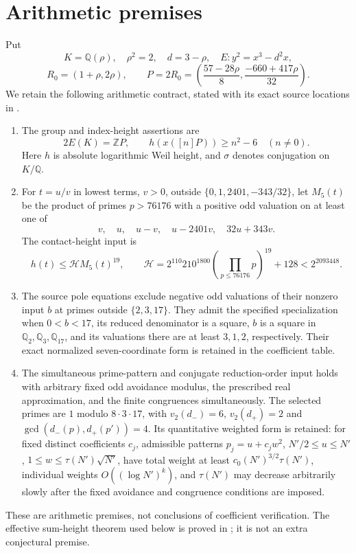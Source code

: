 \documentclass[11pt,a4paper]{article}
\theoremstyle{remark}\newtheorem{remark}[theorem]{Remark}
\newcommand{\Q}{\mathbb Q}\newcommand{\Z}{\mathbb Z}\newcommand{\HH}{\mathcal H}
\begin{document}
\section{Arithmetic premises}\label{sec:premises}
Put
\[
 K=\Q(\rho),\quad\rho^2=2,\quad d=3-\rho,\quad
 E:y^2=x^3-d^2x,
\]
\[
 R_0=(1+\rho,2\rho),\qquad
 P=2R_0=\left(\frac{57-28\rho}{8},\frac{-660+417\rho}{32}\right).
\]
We retain the following arithmetic contract, stated with its exact
source locations in \cite[Section~2]{Source}.
\begin{enumerate}
\item The group and index-height assertions are
\[
 2E(K)=\Z P,\qquad h(x([n]P))\ge n^2-6\quad(n\ne0).
\]
Here $h$ is absolute logarithmic Weil height, and $\sigma$ denotes
conjugation on $K/\Q$.
\item For $t=u/v$ in lowest terms, $v>0$, outside
$\{0,1,2401,-343/32\}$, let $M_5(t)$ be the product of primes
$p>76176$ with a positive odd valuation on at least one of
\[
             v,\quad u,\quad u-v,\quad u-2401v,\quad32u+343v.
\]
The contact-height input is
\[
 h(t)\le\HH M_5(t)^{19},\qquad
 \HH=2^{110}210^{1800}\left(\prod_{p\le76176}p\right)^{19}+128
       <2^{2093448}.
\]
\item The source pole equations exclude negative odd valuations of their
nonzero input $b$ at primes outside $\{2,3,17\}$. They admit the specified
specialization when $0<b<17$, its reduced denominator is a square,
$b$ is a square in $\Q_2,\Q_3,\Q_{17}$, and its valuations there are
at least $3,1,2$, respectively. Their exact normalized seven-coordinate
form is retained in the coefficient table.
\item The simultaneous prime-pattern and conjugate reduction-order input
holds with arbitrary fixed odd avoidance modulus, the prescribed real
approximation, and the finite congruences simultaneously. The selected
primes are $1$ modulo $8\cdot3\cdot17$, with
$v_2(d_-)=6$, $v_2(d_+)=2$ and
$\gcd(d_-(p),d_+(p'))=4$. Its quantitative weighted form is retained:
for fixed distinct coefficients $c_j$, admissible patterns
$p_j=u+c_jw^2$, $N'/2\le u\le N'$,
$1\le w\le\tau(N')\sqrt{N'}$, have total weight at least
$c_0(N')^{3/2}\tau(N')$, individual weights
$O((\log N')^k)$, and $\tau(N')$ may decrease arbitrarily slowly
after the fixed avoidance and congruence conditions are imposed.
\end{enumerate}
These are arithmetic premises, not conclusions of coefficient
verification. The effective sum-height theorem used below is proved
in \cite{Sums}; it is not an extra conjectural premise.
\end{document}
